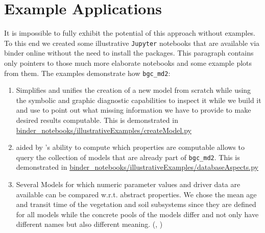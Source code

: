 \section{Example Applications}  
\label{sec:ExampleApplications}
It is impossible to fully exhibit the potential of this approach without
examples.
To this end we created some illustrative \texttt{Jupyter} notebooks that are
available via binder online without the need to install the packages. 
This paragraph contains only pointers to those much more elaborate notebooks
and some example plots from them.
The examples demonstrate how \texttt{bgc_md2}:
\begin{enumerate}
\item 
  Simplifies and unifies the creation of a new model from scratch while using the
  symbolic and graphic diagnostic capabilities to inspect it while we build it
  and use 
  \ComputabilityGraphs{} to point out what missing information we have to
  provide to make desired results computable.
  This is demonstrated in
    \href{https://github.com/MPIBGC-TEE/bgc_md2/blob/binder/binder_notebooks/illustrativeExamples/createModel.py}{binder_notebooks/illustrativeExamples/createModel.py}
    
\item 
  aided by \ComputabilityGraphs{} 's ability to compute which properties are computable
  allows to query the collection of models that are already part of
  \texttt{bgc\_md2}.
  This is demonstrated in
    \href{https://github.com/MPIBGC-TEE/bgc_md2/blob/binder/binder_notebooks/illustrativeExamples/databaseAspects.py}{binder_notebooks/illustrativeExamples/databaseAspects.py}
\item 
  \label{enum:trendy}
  Several Models for which numeric parameter values and driver data are
  available can be compared w.r.t. abstract properties.
  We chose the mean age and transit time of the vegetation and soil subsystems
  since they are defined for all models while the concrete pools of the models
  differ and not only have different names but also different meaning.
  (,  )
\end{enumerate}
